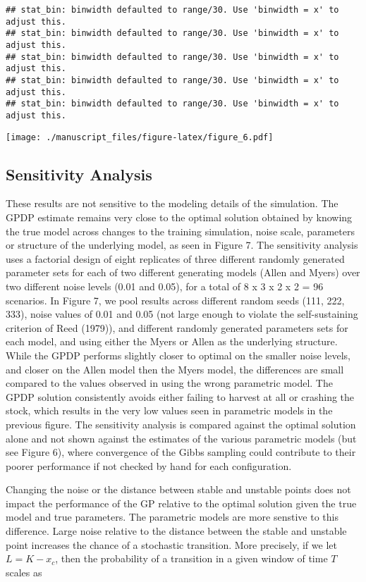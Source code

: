 \documentclass[]{components/elsarticle}
\begin{document}
\begin{verbatim}
## stat_bin: binwidth defaulted to range/30. Use 'binwidth = x' to adjust this.
## stat_bin: binwidth defaulted to range/30. Use 'binwidth = x' to adjust this.
## stat_bin: binwidth defaulted to range/30. Use 'binwidth = x' to adjust this.
## stat_bin: binwidth defaulted to range/30. Use 'binwidth = x' to adjust this.
## stat_bin: binwidth defaulted to range/30. Use 'binwidth = x' to adjust this.
\end{verbatim}

\texttt{[image: ./manuscript\_files/figure-latex/figure\_6.pdf]}

\subsection{Sensitivity Analysis}\label{sensitivity-analysis}

These results are not sensitive to the modeling details of the
simulation. The GPDP estimate remains very close to the optimal solution
obtained by knowing the true model across changes to the training
simulation, noise scale, parameters or structure of the underlying
model, as seen in Figure 7. The sensitivity analysis uses a factorial
design of eight replicates of three different randomly generated
parameter sets for each of two different generating models (Allen and
Myers) over two different noise levels (0.01 and 0.05), for a total of 8
x 3 x 2 x 2 = 96 scenarios. In Figure 7, we pool results across
different random seeds (111, 222, 333), noise values of 0.01 and 0.05
(not large enough to violate the self-sustaining criterion of Reed
(1979)), and different randomly generated parameters sets for each
model, and using either the Myers or Allen as the underlying structure.
While the GPDP performs slightly closer to optimal on the smaller noise
levels, and closer on the Allen model then the Myers model, the
differences are small compared to the values observed in using the wrong
parametric model. The GPDP solution consistently avoids either failing
to harvest at all or crashing the stock, which results in the very low
values seen in parametric models in the previous figure. The sensitivity
analysis is compared against the optimal solution alone and not shown
against the estimates of the various parametric models (but see Figure
6), where convergence of the Gibbs sampling could contribute to their
poorer performance if not checked by hand for each configuration.

Changing the noise or the distance between stable and unstable points
does not impact the performance of the GP relative to the optimal
solution given the true model and true parameters. The parametric models
are more senstive to this difference. Large noise relative to the
distance between the stable and unstable point increases the chance of a
stochastic transition. More precisely, if we let $L = K - x_c$, then the
probability of a transition in a given window of time $T$ scales as
\end{document}
